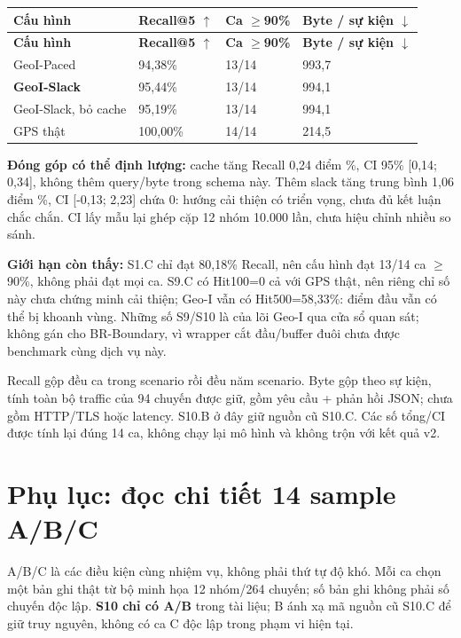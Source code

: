\documentclass[10pt,a4paper]{article}
\begin{document}
\endgroup
\begingroup\small
\begin{longtable}{@{}P{4.839cm}P{3.581cm}P{3.194cm}P{4.742cm}@{}}
\toprule
\textbf{Cấu hình} & \textbf{Recall@5 $\uparrow$} & \textbf{Ca $\ge$90\%} & \textbf{Byte / sự kiện $\downarrow$}\\\midrule
\endfirsthead
\toprule
\textbf{Cấu hình} & \textbf{Recall@5 $\uparrow$} & \textbf{Ca $\ge$90\%} & \textbf{Byte / sự kiện $\downarrow$}\\\midrule
\endhead
\bottomrule\endfoot
GeoI-Paced & 94,38\% & 13/14 & 993,7\\
\addlinespace[3pt]
\textbf{GeoI-Slack} & 95,44\% & 13/14 & 994,1\\
\addlinespace[3pt]
GeoI-Slack, bỏ cache & 95,19\% & 13/14 & 994,1\\
\addlinespace[3pt]
GPS thật & 100,00\% & 14/14 & 214,5\\
\end{longtable}
\endgroup
\textbf{Đóng góp có thể định lượng:} cache tăng Recall 0,24 điểm \%, CI 95\% [0,14; 0,34], không thêm query/byte trong schema này. Thêm slack tăng trung bình 1,06 điểm \%, CI [-0,13; 2,23] chứa 0: hướng cải thiện có triển vọng, chưa đủ kết luận chắc chắn. CI lấy mẫu lại ghép cặp 12 nhóm 10.000 lần, chưa hiệu chỉnh nhiều so sánh.

\textbf{Giới hạn còn thấy:} S1.C chỉ đạt 80,18\% Recall, nên cấu hình đạt 13/14 ca $\ge$90\%, không phải đạt mọi ca. S9.C có Hit100=0 cả với GPS thật, nên riêng chỉ số này chưa chứng minh cải thiện; Geo-I vẫn có Hit500=58,33\%: điểm đầu vẫn có thể bị khoanh vùng. Những số S9/S10 là của lõi Geo-I qua cửa sổ quan sát; không gán cho BR-Boundary, vì wrapper cắt đầu/buffer đuôi chưa được benchmark cùng dịch vụ này.

Recall gộp đều ca trong scenario rồi đều năm scenario. Byte gộp theo sự kiện, tính toàn bộ traffic của 94 chuyến được giữ, gồm yêu cầu + phản hồi JSON; chưa gồm HTTP/TLS hoặc latency. S10.B ở đây giữ nguồn cũ S10.C. Các số tổng/CI được tính lại đúng 14 ca, không chạy lại mô hình và không trộn với kết quả v2.


\clearpage
\section{Phụ lục: đọc chi tiết 14 sample A/B/C}\label{sec:4}
A/B/C là các điều kiện cùng nhiệm vụ, không phải thứ tự độ khó. Mỗi ca chọn một bản ghi thật từ bộ minh họa 12 nhóm/264 chuyến; số bản ghi không phải số chuyến độc lập. \textbf{S10 chỉ có A/B} trong tài liệu; B ánh xạ mã nguồn cũ S10.C để giữ truy nguyên, không có ca C độc lập trong phạm vi hiện tại.
\end{document}
